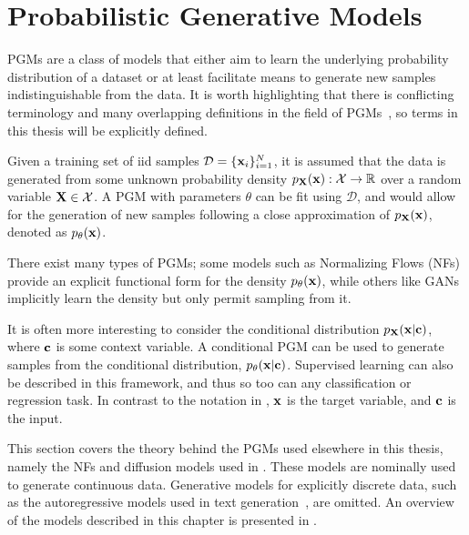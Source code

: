 \chapter{Probabilistic Generative Models}
\label{ch:generative_models}

\Glspl{PGM} are a class of models that either aim to learn the underlying probability distribution of a dataset or at least facilitate means to generate new samples indistinguishable from the data.
It is worth highlighting that there is conflicting terminology and many overlapping definitions in the field of \Glspl{PGM}~\cite{DiscriminativeVsGenerative, MachineLearningDiscriminative}, so terms in this thesis will be explicitly defined.

Given a training set of \Gls{iid} samples $\mathcal{D} = \{\mathbf{x}_i\}_{i=1}^N$, it is assumed that the data is generated from some unknown probability density $p_{\mathbf{X}}(\mathbf{x}): \mathcal{X} \rightarrow \mathbb{R}$ over a random variable $\mathbf{X} \in \mathcal{X}$.
A \Gls{PGM} with parameters $\theta$ can be fit using $\mathcal{D}$, and would allow for the generation of new samples following a close approximation of $p_{\mathbf{X}}(\mathbf{x})$, denoted as $p_{\theta}(\mathbf{x})$.

There exist many types of \Glspl{PGM}; some models such as Normalizing Flows (NFs)~\cite{VariationalInferenceNormalizing} provide an explicit functional form for the density $p_{\theta}(\mathbf{x})$, while others like \Glspl{GAN}~\cite{GenerativeAdversarialNetworks} implicitly learn the density but only permit sampling from it.

It is often more interesting to consider the conditional distribution $p_{\mathbf{X}}(\mathbf{x}|\mathbf{c})$, where $\mathbf{c}$ is some context variable.
A conditional \Gls{PGM} can be used to generate samples from the conditional distribution, $p_{\theta}(\mathbf{x}|\mathbf{c})$.
Supervised learning can also be described in this framework, and thus so too can any classification or regression task.
In contrast to the notation in , $\mathbf{x}$ is the target variable, and $\mathbf{c}$ is the input.

This section covers the theory behind the \Glspl{PGM} used elsewhere in this thesis, namely the NFs and diffusion models used in .
These models are nominally used to generate continuous data.
Generative models for explicitly discrete data, such as the autoregressive models used in text generation~\cite{GPT2}, are omitted.
An overview of the models described in this chapter is presented in .

